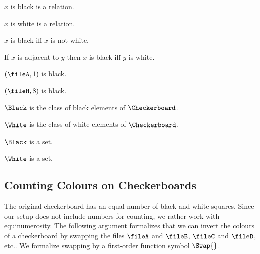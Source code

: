\begin{forthel}
    \begin{signature} $x$ is black is a relation. \end{signature}
    \begin{signature} $x$ is white is a relation. \end{signature}

    \begin{axiom} $x$ is black iff $x$ is not white. \end{axiom}
    \begin{axiom} If $x$ is adjacent to $y$ then $x$ is black iff $y$ is white. \end{axiom}

    \begin{axiom} $(\fileA,1)$ is black. \end{axiom}
    \begin{axiom} $(\fileH,8)$ is black. \end{axiom}

    \begin{definition} $\Black$ is the class of black elements of $\Checkerboard$. \end{definition}
    \begin{definition} $\White$ is the class of white elements of $\Checkerboard$. \end{definition}

    \begin{lemma} $\Black$ is a set. \end{lemma}
    \begin{lemma} $\White$ is a set. \end{lemma}
\end{forthel}


\subsection{Counting Colours on Checkerboards}

The original checkerboard has an equal number of black and white squares.
Since our setup does not include numbers for counting, we rather work with
equinumerosity. The following argument formalizes that we can invert the
colours of a checkerboard by swapping the files $\fileA$ and $\fileB$, $\fileC$ and $\fileD$, etc..
We formalize swapping by a first-order function symbol $\Swap{}$.

